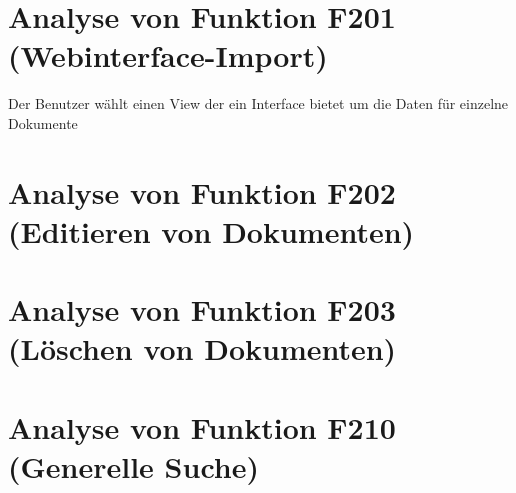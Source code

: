 \section{Analyse von Funktion F201 (Webinterface-Import)}
Der Benutzer wählt einen View der ein Interface bietet um die Daten für einzelne
Dokumente 

\section{Analyse von Funktion F202 (Editieren von Dokumenten)}

\section{Analyse von Funktion F203 (Löschen von Dokumenten)}

\section{Analyse von Funktion F210 (Generelle Suche)}
